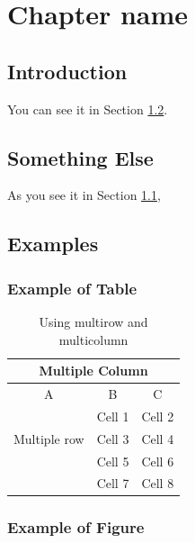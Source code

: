 \documentclass[]{book} %
\begin{document}
\tableofcontents \newpage
\listoffigures \newpage
\listoftables \newpage

\chapter{Chapter name}

\section{Introduction}\label{sec:intro}

\lipsum[1] 

You can see it in Section \ref{sec:sth}.

\section{Something Else}\label{sec:sth}

As you see it in Section \ref{sec:intro}, \lipsum[1]

\section{Examples}

\lipsum {}

\subsection{Example of Table}

\begin{table}[!h]
\centering
\begin{tabular}{|c|c|c|}
	\hline 
	\multicolumn{3}{|c|}{Multiple Column} \\
	\hline 
	A &  B & C \\
	\hline 
	\multirow{3}{*}{Multiple row} & Cell 1 & Cell 2 \\
	& Cell 3 & Cell 4 \\
	& Cell 5 & Cell 6 \\
	& Cell 7 & Cell 8 \\
	\hline
 \end{tabular}
\caption{Using multirow and multicolumn}
\label{tab:multi}
\end{table}

\subsection{Example of Figure}

\lipsum {}
\end{document}
